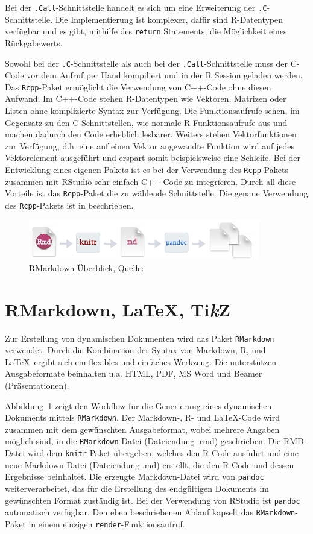 Bei der \texttt{.Call}-Schnittstelle handelt es sich um eine Erweiterung der \texttt{.C}-Schnittstelle. Die Implementierung ist komplexer, dafür sind R-Datentypen verfügbar und es gibt, mithilfe des \texttt{return} Statements, die Möglichkeit eines Rückgabewerts.

Sowohl bei der \texttt{.C}-Schnittstelle als auch bei der \texttt{.Call}-Schnittstelle muss der C-Code vor dem Aufruf per Hand kompiliert und in der R Session geladen werden. Das \texttt{Rcpp}-Paket ermöglicht die Verwendung von C++-Code ohne diesen Aufwand. Im C++-Code stehen R-Datentypen wie Vektoren, Matrizen oder Listen ohne komplizierte Syntax zur Verfügung. Die Funktionsaufrufe sehen, im Gegensatz zu den C-Schnittstellen, wie normale R-Funktionsaufrufe aus und machen dadurch den Code erheblich lesbarer. Weiters stehen Vektorfunktionen zur Verfügung, d.h. eine auf einen Vektor angewandte Funktion wird auf jedes Vektorelement ausgeführt und erspart somit beispielsweise eine Schleife. Bei der Entwicklung eines eigenen Pakets ist es bei der Verwendung des \texttt{Rcpp}-Pakets zusammen mit RStudio sehr einfach C++-Code zu integrieren. Durch all diese Vorteile ist das \texttt{Rcpp}-Paket die zu wählende Schnittstelle. Die genaue Verwendung des \texttt{Rcpp}-Pakets ist in \cite[S.~395~ff.]{wickham2015advanced} beschrieben.
\begin{figure}[t]
\centering
\includegraphics[width=0.9\textwidth]{abbildungen/rmarkdown}
\caption[RMarkdown Überblick]{RMarkdown Überblick, Quelle:~\cite{rmarkdown}}
\label{abb:rmarkdown}
\end{figure}
\section{RMarkdown, \LaTeX, Ti\textit{k}Z}
\label{kapitel:rmarkdown}
Zur Erstellung von dynamischen Dokumenten wird das Paket \texttt{RMarkdown} verwendet. Durch die Kombination der Syntax von Markdown, R, und \LaTeX\ ergibt sich ein flexibles und einfaches Werkzeug. Die unterstützen Ausgabeformate beinhalten u.a. HTML, PDF, MS Word und Beamer (Präsentationen).

Abbildung~\ref{abb:rmarkdown} zeigt den Workflow für die Generierung eines dynamischen Dokuments mittels \texttt{RMarkdown}. Der Markdown-, R- und \LaTeX -Code wird zusammen mit dem gewünschten Ausgabeformat, wobei mehrere Angaben möglich sind, in die \texttt{RMarkdown}-Datei (Dateiendung .rmd) geschrieben. Die RMD-Datei wird dem \texttt{knitr}-Paket übergeben, welches den R-Code ausführt und eine neue Markdown-Datei (Dateiendung .md) erstellt, die den R-Code und dessen Ergebnisse beinhaltet. Die erzeugte Markdown-Datei wird von \texttt{pandoc} weiterverarbeitet, das für die Erstellung des endgültigen Dokuments im gewünschten Format zuständig ist. Bei der Verwendung von RStudio ist \texttt{pandoc} automatisch verfügbar. Den eben beschriebenen Ablauf kapselt das \texttt{RMarkdown}-Paket in einem einzigen \texttt{render}-Funktionsaufruf.

